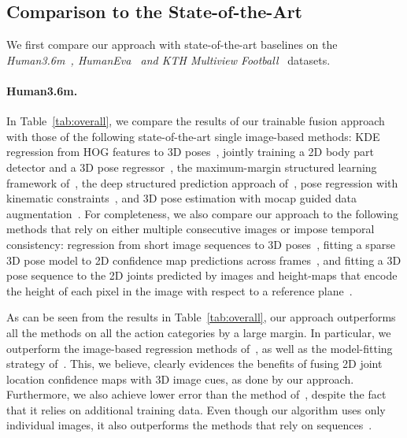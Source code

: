 \subsection{Comparison to the State-of-the-Art}

We first compare our approach with state-of-the-art baselines on the \emph{Human3.6m~\cite{Ionescu14a}, 
	HumanEva~\cite{Sigal06} and KTH Multiview Football~\cite{Burenius13}} datasets. 

\vspace{-4mm}

\paragraph{Human3.6m.} In Table~\ref{tab:overall},
we  compare the  results of our trainable fusion approach with  those of  the following  state-of-the-art
single image-based  methods: KDE regression  from HOG features  to 3D
poses~\cite{Ionescu14a}, jointly training a 2D  body part detector and a
3D pose  regressor~\cite{Li14a,Park16}, the maximum-margin  structured learning
framework of~\cite{Li15a,Li16b}, the deep structured prediction approach
of~\cite{Tekin16b}, pose regression with kinematic constraints~\cite{Zhou16b},
and  3D  pose  estimation  with  mocap  guided  data
augmentation~\cite{Rogez16}.   For  completeness,  we also  compare  our
approach  to  the  following  methods   that  rely  on  either  multiple
consecutive images or impose temporal consistency: regression from short
image sequences  to 3D poses~\cite{Tekin16a},  fitting a sparse  3D pose
model to  2D  confidence map predictions across  frames~\cite{Zhou16a}, and
fitting a  3D pose  sequence to  the 2D joints  predicted by  images and
height-maps that encode the height of each pixel in the image with respect 
to a reference plane~\cite{Du16}. 
	
As can be seen from the results in Table~\ref{tab:overall}, our approach
outperforms all the methods on all the action categories
by a large margin. In  particular,  we  outperform   the  image-based  
regression  methods of~\cite{Ionescu14a,Li14a,Li15a,Li16b,Tekin16b,Park16,Zhou16b},   as    
well   as   the model-fitting strategy of~\cite{Li15a,Li16b}.  This, we 
believe, clearly evidences the  benefits of fusing 2D joint location confidence maps with 3D 
image  cues, as done by our approach. Furthermore,  we also achieve lower error than
the  method  of~\cite{Rogez16},  despite  the fact  that  it  relies  on
additional training data. Even though our algorithm uses
only individual  images, it  also outperforms the  methods that  rely on
sequences~\cite{Du16,Tekin16a,Zhou16a}.  

